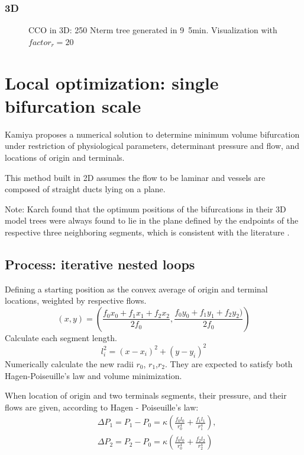 \documentclass[a4paper, 11pt]{article} %
\begin{document}
\subsubsection{3D}
\begin{figure}[!h]
\centering
\caption{CCO in 3D: 250 Nterm tree generated in \unit{9.5}{min}. Visualization with $ factor_r = 20 $}
\label{fig:CCO 2D}
\end{figure}



\section{Local optimization: single bifurcation scale}\label{Kamiya}
Kamiya proposes a numerical solution to determine minimum volume bifurcation under restriction of physiological parameters, determinant pressure and flow, and locations of origin and terminals.

This method built in 2D assumes the flow to be laminar and vessels are composed of straight ducts lying on a plane. 

Note: Karch found that the optimum positions of the bifurcations in their 3D model trees were always found to lie in the plane defined by the endpoints of the respective three neighboring segments, which is consistent with the literature \cite{zamir1986branching}. 


\subsection*{Process: iterative nested loops}

Defining a starting position as the convex average of origin and terminal locations, weighted by respective flows.
\begin{equation}
(x,y) = (\frac{f_0x_0 + f_1x_1 + f_2x_2}{2f_0},\frac{f_0y_0 + f_1y_1 + f_2y_2 )}{2f_0})
\end{equation}
Calculate each segment length.
\begin{equation}
l_i^2 = (x - x_i)^2 + (y - y_i)^2
\label{length}
\end{equation}
Numerically calculate the new radii $r_0$, $r_1$,$r_2$. They are expected to satisfy both Hagen-Poiseuille's law and volume minimization.

When location of origin and two terminals segments, their pressure, and their flows are given, according to Hagen - Poiseuille's law:
\begin{align}
&\Delta P_1 = P_1 - P_0 = \kappa(\frac{f_0l_0}{r_0^4} + \frac{f_1l_1}{r_1^4}), \\
&\Delta P_2 = P_2 - P_0 = \kappa(\frac{f_0l_0}{r_0^4} + \frac{f_2l_2}{r_2^4})
\label{poiseuille}
\end{align}
  
\end{document}
